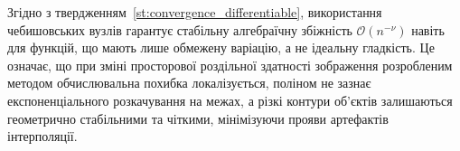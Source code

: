 Згідно з твердженням~\ref{st:convergence_differentiable}, використання чебишовських вузлів гарантує стабільну алгебраїчну збіжність $\mathcal{O}(n^{-\nu})$ навіть для функцій, що мають лише обмежену варіацію, а не ідеальну гладкість. Це означає, що при зміні просторової роздільної здатності зображення розробленим методом обчислювальна похибка локалізується, поліном не зазнає експоненціального розкачування на межах, а різкі контури об'єктів залишаються геометрично стабільними та чіткими, мінімізуючи прояви артефактів інтерполяції.